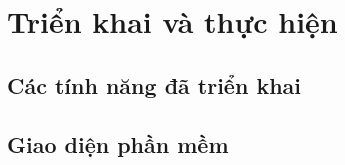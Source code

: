 \section{Triển khai và thực hiện}
\subsection{Các tính năng đã triển khai}

\subsection{Giao diện phần mềm}
\newpage
